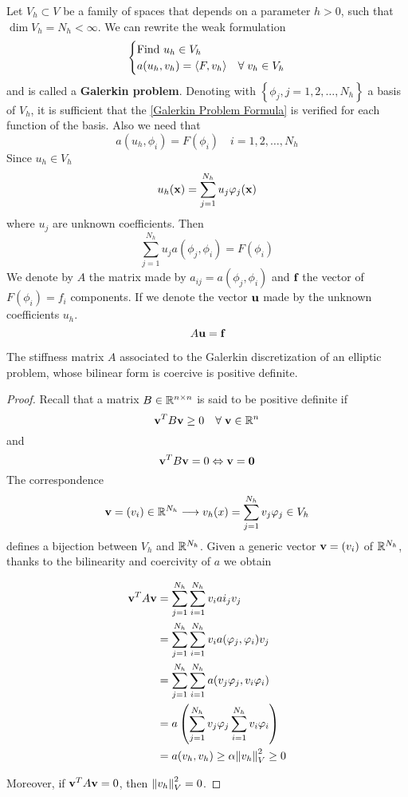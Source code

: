 Let \(V_h \subset V\) be a family of spaces that depends on a parameter \(h > 0\), such that \(\dim V_h = N_h < \infty\).
We can rewrite the weak formulation 
\begin{equation}
    \begin{cases}
        \text{Find } u_h \in V_h\\
        a(u_h,v_h) = \langle F,v_h \rangle & \forall \; v_h \in V_h \label{Galerkin Problem Formula}
    \end{cases}
\end{equation}
and is called a \textbf{Galerkin problem}. Denoting with \(\left\{\phi_j, j = 1,2,\ldots,N_h\right\}\) a basis of \(V_h\), it is sufficient that the \eqref{Galerkin Problem Formula} is verified for each function of the basis. 
Also we need that 
\[
    a(u_h, \phi_i) = F(\phi_i) \quad i = 1, 2, \ldots , N_h
\]
Since \(u_h \in V_h\)
\[
    u_h(\textbf{x})=\sum_{j=1}^{N_h} u_j \varphi_j(\textbf{x})
\]
where \(u_j\) are unknown coefficients. Then
\[
    \sum_{j=1}^{N_h}u_j a(\phi_j, \phi_i) = F(\phi_i)
\]
We denote by \(A\) the matrix made by \(a_{ij} = a(\phi_j, \phi_i)\) and \(\textbf{f}\) the vector of \(F(\phi_i) = f_i\) components. If we denote the vector \(\textbf{u}\) made by the unknown coefficients \(u_h\).
\begin{equation}
    A\textbf{u} = \textbf{f}
    \label{Linear system Galerkin}
\end{equation}

    \begin{theorem}
    The stiffness matrix \(A\) associated to the Galerkin discretization of an elliptic problem, whose bilinear form is coercive is positive definite.
\end{theorem}
\begin{proof}
    Recall that a matrix \(B \in \mathbb{R}^{n\times n}\) is said to be positive definite if 
    \[
        \textbf{v}^TB\textbf{v} \geq 0 \quad \forall \; \textbf{v} \in \mathbb{R}^n
    \]
    and
    \[
        \textbf{v}^T B \textbf{v} = 0 \Leftrightarrow \textbf{v} = \textbf{0}
    \]
    The correspondence 
    \[
        \textbf{v} = (v_i) \in \mathbb{R}^{N_h} \longrightarrow v_h(x) = \sum_{j=1}^{N_h} v_j\varphi_j \in V_h
    \]
    defines a bijection between \(V_h\) and \(\mathbb{R}^{N_h}\). Given a generic vector \(\textbf{v} = (v_i)\) of \(\mathbb{R}^{N_h}\), thanks to the bilinearity and coercivity of \(a\) we obtain 
    
        \begin{align*}
        \textbf{v}^T A \textbf{v} & = \sum_{j=1}^{N_h}\sum_{i=1}^{N_h} v_i ai_j v_j \\
        & = \sum_{j=1}^{N_h}\sum_{i=1}^{N_h} v_ia(\varphi_j, \varphi_i)v_j\\
        & = \sum_{j=1}^{N_h}\sum_{i=1}^{N_h} a(v_j\varphi_j, v_i \varphi_i)\\
        & = a\left(\sum_{j=1}^{N_h}v_j\varphi_j\sum_{i=1}^{N_h}v_i\varphi_i\right)\\
        & = a(v_h,v_h) \geq \alpha \norm{v_h}_V^2 \geq 0
        \end{align*}

    Moreover, if \(\textbf{v}^T A \textbf{v} = 0\), then \(\norm{v_h}_V^2 = 0\).
\end{proof}


